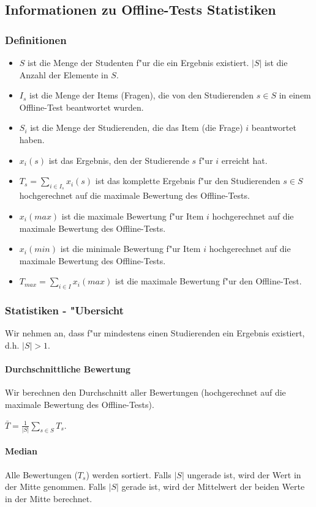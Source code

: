 \documentclass[12pt]{report}
\begin{document}
\subsection{Informationen zu Offline-Tests Statistiken}
\subsubsection{Definitionen}
\begin{itemize}
\item $S$ ist die Menge der Studenten f"ur die ein Ergebnis existiert. $|S|$ ist die Anzahl der Elemente in $S$.
\item $I_s$ ist die Menge der Items (Fragen), die von den Studierenden $s\in S$ in einem Offline-Test beantwortet wurden.
\item $S_i$ ist die Menge der Studierenden, die das Item (die Frage) $i$ beantwortet haben.
\item $x_i(s)$ ist das Ergebnis, den der Studierende $s$ f"ur $i$ erreicht hat.
\item $T_s = \sum\limits_{i\in I_s} x_i(s)$ ist das komplette Ergebnis f"ur den Studierenden $s\in S$ hochgerechnet auf die maximale Bewertung des Offline-Tests.
\item $x_i(max)$ ist die maximale Bewertung f"ur Item $i$ hochgerechnet auf die maximale Bewertung des Offline-Tests. 
\item $x_i(min)$ ist die minimale Bewertung f"ur Item $i$ hochgerechnet auf die maximale Bewertung des Offline-Tests. 
\item $T_{max}=\sum\limits_{i\in I} x_i(max)$ ist die maximale Bewertung f"ur den Offline-Test.
\end{itemize}

\subsubsection{Statistiken - "Ubersicht}
Wir nehmen an, dass f"ur mindestens einen Studierenden ein Ergebnis existiert, d.h. $|S|>1$.

\paragraph{Durchschnittliche Bewertung}
Wir berechnen den Durchschnitt aller Bewertungen (hochgerechnet auf die maximale Bewertung des Offline-Tests).

$\bar{T}=\frac{1}{|S|}\sum\limits_{s\in S}T_s$.

\paragraph{Median}
Alle Bewertungen ($T_s$) werden sortiert. Falls $|S|$ ungerade ist, wird der Wert in der Mitte genommen. Falls $|S|$ gerade ist, wird der Mittelwert der beiden Werte in der Mitte berechnet. 
\end{document}

